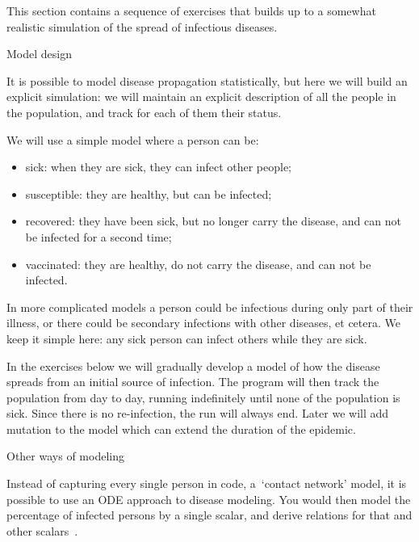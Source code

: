 
This section contains a sequence of exercises that builds up to a
somewhat realistic simulation of the spread of infectious
diseases. 

 {Model design}

It is possible to model disease propagation statistically, but here we
will build an explicit simulation: we will maintain an explicit
description of all
the people in the population, and track for each of them their status.

We will use a simple model where a person can be:
\begin{itemize}
\item sick: when they are sick, they can infect other people;
\item susceptible: they are healthy, but can be infected;
\item recovered: they have been sick, but no longer carry the disease,
  and can not be infected for a second time;
\item vaccinated: they are healthy, do not carry the disease, and can
  not be infected.
\end{itemize}
In more complicated models a person could be infectious during only
part of their illness, or there could be secondary infections with
other diseases, et cetera. We keep it simple here:
any sick person can infect others while they are sick.

In the exercises below we will gradually develop a
model of how the disease spreads from an initial source of infection.
The program will then track the population from day to day,
running indefinitely until none of the population
is sick. Since there is no re-infection, the run will always end.
Later we will add mutation to the model which can extend the duration
of the epidemic.

 {Other ways of modeling}

Instead of capturing every single person in code, a~`contact network'
model,
it is possible to use an
\ac{ODE} approach to disease modeling. You would then model the
percentage of infected persons by a single scalar, and derive
relations for that and other scalars~\cite{Anderson:population1979,KermackSIR}.

